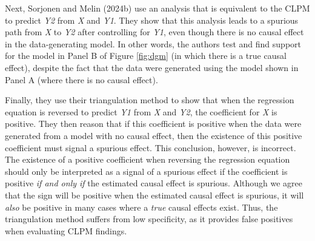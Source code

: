 \documentclass[
  man,floatsintext]{apa6}
\begin{document}
Next, Sorjonen and Melin (2024b) use an analysis that is equivalent to the CLPM to predict \emph{Y2} from \emph{X} and \emph{Y1}. They show that this analysis leads to a spurious path from \emph{X} to \emph{Y2} after controlling for \emph{Y1}, even though there is no causal effect in the data-generating model. In other words, the authors test and find support for the model in Panel B of Figure \ref{fig:dgm} (in which there is a true causal effect), despite the fact that the data were generated using the model shown in Panel A (where there is no causal effect).

Finally, they use their triangulation method to show that when the regression equation is reversed to predict \emph{Y1} from \emph{X} and \emph{Y2}, the coefficient for \emph{X} is positive. They then reason that if this coefficient is positive when the data were generated from a model with no causal effect, then the existence of this positive coefficient must signal a spurious effect. This conclusion, however, is incorrect. The existence of a positive coefficient when reversing the regression equation should only be interpreted as a signal of a spurious effect if the coefficient is positive \emph{if and only if} the estimated causal effect is spurious. Although we agree that the sign will be positive when the estimated causal effect is spurious, it will \emph{also} be positive in many cases where a \emph{true} causal effects exist. Thus, the triangulation method suffers from low specificity, as it provides false positives when evaluating CLPM findings.
\end{document}

